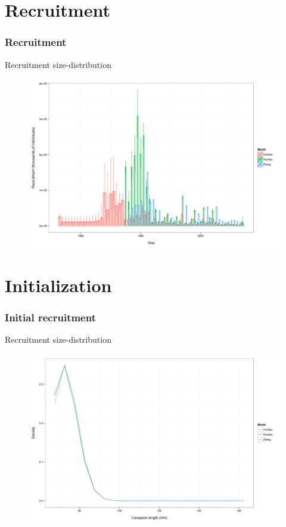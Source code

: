 \documentclass{beamer}
\begin{document}

\section{Recruitment}


\begin{frame}
\frametitle{Recruitment}
Recruitment size-distribution
\begin{figure}[!htbp]
  \centering
  \includegraphics[width=0.6\linewidth]{figure/recruitment-1.png}
\end{figure}
\end{frame}


\section{Initialization}


\begin{frame}
\frametitle{Initial recruitment}
Recruitment size-distribution
\begin{figure}[!htbp]
  \centering
  \includegraphics[width=0.6\linewidth]{figure/init_rec-1.png}
\end{figure}
\end{frame}
\end{document}
